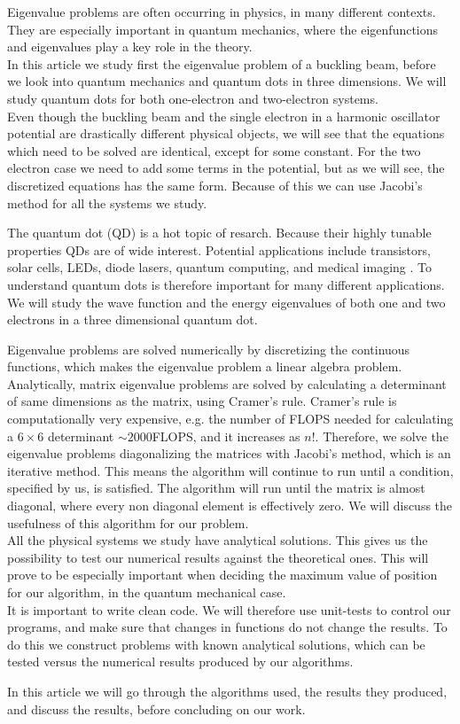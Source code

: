 \documentclass[%
 reprint,
nofootinbib,
aps,
]{revtex4-1}
\begin{document}
Eigenvalue problems are often occurring in physics, in many different contexts. They are especially important in quantum mechanics, where the eigenfunctions and eigenvalues play a key role in the theory.\\
In this article we study first the eigenvalue problem of a buckling beam, before we look into quantum mechanics and quantum dots in three dimensions. We will study quantum dots for both one-electron and two-electron systems.\\
Even though the buckling beam and the single electron in a harmonic oscillator potential are drastically different physical objects, we will see that the equations which need to be solved are identical, except for some constant. For the two electron case we need to add some terms in the potential, but as we will see, the discretized equations has the same form. Because of this we can use Jacobi's method for all the systems we study.\par
The quantum dot (QD) is a hot topic of resarch. Because their highly tunable properties QDs are of wide interest. Potential applications include transistors, solar cells, LEDs, diode lasers, quantum computing, and medical imaging \cite{Q_DOTS}. To understand quantum dots is therefore important for many different applications. We will study the wave function and the energy eigenvalues of both one and two electrons in a three dimensional quantum dot.\par

Eigenvalue problems are solved numerically by discretizing the continuous functions, which makes the eigenvalue problem a linear algebra problem. Analytically, matrix eigenvalue problems are solved by calculating a determinant of same dimensions as the matrix, using Cramer's rule. Cramer's rule is computationally very expensive, e.g. the number of FLOPS needed for calculating a $6 \times 6$ determinant $\sim 2000$FLOPS, and it increases as $n!$. Therefore, we solve the eigenvalue problems diagonalizing the matrices with Jacobi's method, which is an iterative method. This means the algorithm will continue to run until a condition, specified by us, is satisfied. The algorithm will run until the matrix is almost diagonal, where every non diagonal element is effectively zero. We will discuss the usefulness of this algorithm for our problem. \\
All the physical systems we study have analytical solutions. This gives us the possibility to test our numerical results against the theoretical ones. This will prove to be especially important when deciding the maximum value of position for our algorithm, in the quantum mechanical case.\\
It is important to write clean code. We will therefore use unit-tests to control our programs, and make sure that changes in functions do not change the results. To do this we construct problems with known analytical solutions, which can be tested versus the numerical results produced by our algorithms.\par
\par
In this article we will go through the algorithms used, the results they produced, and discuss the results, before concluding on our work.
\end{document}
